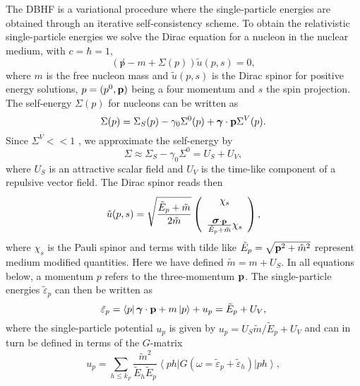 The DBHF is a variational procedure where the single-particle
energies are obtained through an iterative self-consistency scheme.
To obtain the relativistic single-particle energies
we solve the Dirac equation for
a nucleon in the nuclear 
medium, with $c=\hbar=1$,
\begin{equation}
       (\not p -m +\Sigma (p))\tilde{u}(p,s)=0,
\end{equation}
where $m$ is the free nucleon mass and $\tilde{u}(p,s)$ is  
the Dirac spinor for positive energy solutions, 
 $p=(p^0 ,{\bf p})$ being
a four momentum and  $s$ the spin projection.
The self-energy $\Sigma (p)$ 
for nucleons can be written as
\begin{equation}
       \Sigma(p) =
       \Sigma_S(p) -\gamma_0 \Sigma^0(p)
       +\mbox{\boldmath $\gamma$}\cdot {\bf p}\Sigma^V(p).
\end{equation}
Since $\Sigma^V << 1$ \cite{bm90,sw86}, we approximate 
the self-energy by
\begin{equation}
       \Sigma \approx \Sigma_S -\gamma_0 \Sigma^0 = U_S + U_V,
\end{equation}
where $U_S$ is an attractive
scalar field and $U_V$ is the time-like component
of a repulsive vector field.
The Dirac spinor reads then
\begin{equation}
       \tilde{u}(p,s)=\sqrt{\frac{\tilde{E}_p+\tilde{m}}{2\tilde{m}}}
       \left(\begin{array}{c} \chi_s\\ \\
       \frac{\mbox{\boldmath $\sigma$}\cdot{\bf p}}
       {\tilde{E}_p+\tilde{m}}\chi_s
       \end{array}\right),
\end{equation}
where 
$\chi_s$ is the Pauli
spinor and 
terms with tilde like $\tilde{E}_p=\sqrt{{\bf p}^2+\tilde{m}^2}$
represent medium modified quantities.
Here we have defined \cite{bm90,sw86} $\tilde{m}=m+U_S$.
In all equations below, a momentum $p$ refers to the three-momentum
${\bf p}$.  
The single-particle energies 
$\tilde{\varepsilon}_p$ can then be written as
\begin{equation}
       \tilde{\varepsilon}_p=
       \left\langle  p\right|\mbox{\boldmath $\gamma$}\cdot {\bf p}
        +m\left| p \right\rangle+u_p=
       \tilde{E}_p +U_V,
       \label{eq:sprelen}
\end{equation}
where the single-particle potential $u_p$ is given by 
$u_p=U_S\tilde{m}/\tilde{E}_p+U_V$ and 
can in turn be defined in terms
of the $G$-matrix
\begin{equation}
       u_p =\sum_{h\leq k_F} \frac{\tilde{m}^2}{\tilde{E}_h
       \tilde{E}_p}
       \left\langle  ph \right|
       G(\omega =\tilde{\varepsilon}_p
       +\tilde{\varepsilon}_h) \left| ph \right\rangle,
       \label{eq:urel}
\end{equation}
